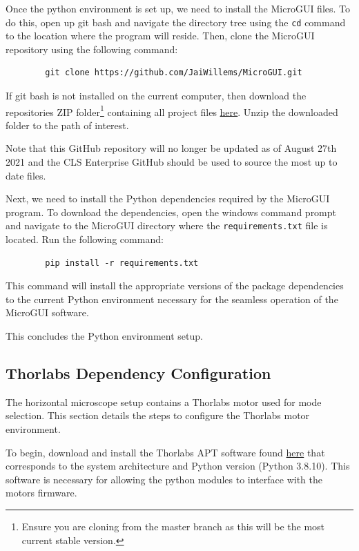 \documentclass[a4paper, 12pt]{report}
\begin{document}
    Once the python environment is set up, we need to install the MicroGUI files. To do this, open up git bash and navigate the directory tree using the \verb|cd| command to the location where the program will reside. Then, clone the MicroGUI repository using the following command:
    
    \begin{verbatim}
        git clone https://github.com/JaiWillems/MicroGUI.git
    \end{verbatim}
    
    If git bash is not installed on the current computer, then download the repositories ZIP folder\footnote{Ensure you are cloning from the master branch as this will be the most current stable version.} containing all project files \href{https://github.com/JaiWillems/MicroGUI}{here}. Unzip the downloaded folder to the path of interest.
    
    Note that this GitHub repository will no longer be updated as of August 27th 2021 and the CLS Enterprise GitHub should be used to source the most up to date files.
    
    Next, we need to install the Python dependencies required by the MicroGUI program. To download the dependencies, open the windows command prompt and navigate to the MicroGUI directory where the \verb|requirements.txt| file is located. Run the following command:
    
    \begin{verbatim}
        pip install -r requirements.txt
    \end{verbatim}
    
    This command will install the appropriate versions of the package dependencies to the current Python environment necessary for the seamless operation of the MicroGUI software.
    
    This concludes the Python environment setup.
    
    
    \subsection{Thorlabs Dependency Configuration}
    The horizontal microscope setup contains a Thorlabs motor used for mode selection. This section details the steps to configure the Thorlabs motor environment.
    
    To begin, download and install the Thorlabs APT software found \href{https://www.thorlabs.com/software_pages/ViewSoftwarePage.cfm?Code=Motion_Control&viewtab=1}{here} that corresponds to the system architecture and Python version (Python 3.8.10). This software is necessary for allowing the python modules to interface with the motors firmware.
    
\end{document}
